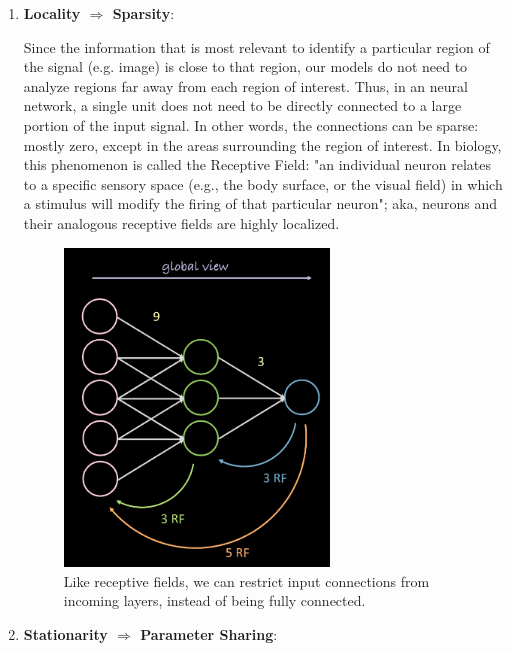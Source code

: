     \begin{enumerate}
        \item \textbf{Locality \(\Rightarrow\) Sparsity}: 
    
           Since the information that is most relevant to identify a particular region of the signal (e.g. image) is close to that region, our models do not need to analyze regions far away from each region of interest. 
           Thus, in an neural network, a single unit does not need to be directly connected to a large portion of the input signal. 
            In other words, the connections can be sparse: mostly zero, except in the areas surrounding the region of interest. 
            In biology, this phenomenon is called the Receptive Field: "an individual neuron relates to a specific sensory space (e.g., the body surface, or the visual field) in which a stimulus will modify the firing of that particular neuron"; aka, neurons and their analogous 
            receptive fields are highly localized.
            
            \begin{figure}[H]
            \begin{center}
            \includegraphics[width=200pt]{labs/03/images/sparsity.png}
            \end{center}
            \captionsetup{justification=centering, margin=2cm}
            \caption{Like receptive fields, we can restrict input connections from incoming layers, instead of being fully connected.}
            \end{figure}
        
        
        \item \textbf{Stationarity \(\Rightarrow\) Parameter Sharing}:
        

\end{enumerate}
